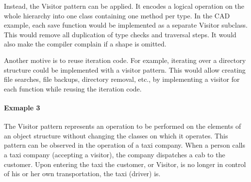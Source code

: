 \documentclass{book}
\begin{document}
Instead, the Visitor pattern can be applied. 
It encodes a logical operation on the whole hierarchy into one class containing one method per type.
In the CAD example, each save function would be implemented as a separate Visitor subclass.
This would remove all duplication of type checks and traversal steps. It would also make the compiler complain if a shape is omitted.

Another motive is to reuse iteration code. 
For example, iterating over a directory structure could be implemented with a visitor pattern. 
This would allow creating file searches, file backups, directory removal, etc., by implementing a visitor for each function while reusing the iteration code.
\paragraph{Exmaple 3}
The Visitor pattern represents an operation to be performed on the elements of an object structure without changing the classes on which it operates.
This pattern can be observed in the operation of a taxi company. When a person calls a taxi company (accepting a visitor), the company dispatches a cab to the customer.
Upon entering the taxi the customer, or Visitor, is no longer in control of his or her own transportation, the taxi (driver) is.
\begin{figure}[H]
\begin{floatrow}
\end{floatrow}
\end{figure}
\end{document}
